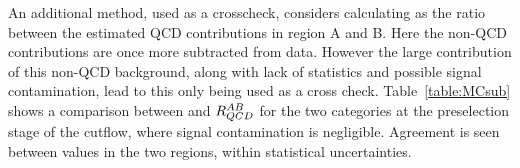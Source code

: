 An additional method, used as a crosscheck, considers calculating \rqcd as the ratio between the estimated QCD contributions in region A 
and B. Here the non-QCD contributions are once more subtracted from data. However the large contribution of this non-QCD background, 
along with lack of statistics and possible signal contamination, lead to this only being used as a cross check. Table~\ref{table:MCsub} shows 
a comparison between \rqcd and $R_{QCD}^{AB}$ for the two categories at the preselection stage of the cutflow, where signal contamination is negligible. 
Agreement is seen between \rqcd values in the two regions, within statistical uncertainties. 



